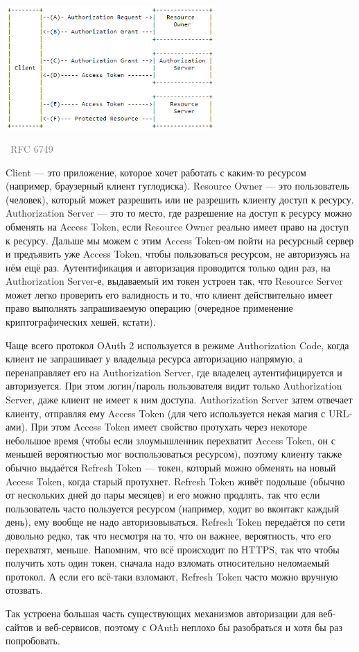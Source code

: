 \documentclass[a5paper]{article}
\newcommand{\attribution}[1] {
\vspace{-5mm}\begin{flushright}\begin{scriptsize}\textcolor{gray}{\textcopyright\, #1}\end{scriptsize}\end{flushright}
}
\begin{document}
\begin{center}
    \includegraphics[width=0.6\textwidth]{oauth.png}
    \attribution{RFC 6749}
\end{center}

Client --- это приложение, которое хочет работать с каким-то ресурсом (например, браузерный клиент гуглодиска). Resource Owner --- это пользователь (человек), который может разрешить или не разрешить клиенту доступ к ресурсу. Authorization Server --- это то место, где разрешение на доступ к ресурсу можно обменять на Access Token, если Resource Owner реально имеет право на доступ к ресурсу. Дальше мы можем с этим Access Token-ом пойти на ресурсный сервер и предъявить уже Access Token, чтобы пользоваться ресурсом, не авторизуясь на нём ещё раз. Аутентификация и авторизация проводится только один раз, на Authorization Server-е, выдаваемый им токен устроен так, что Resource Server может легко проверить его валидность и то, что клиент действительно имеет право выполнять запрашиваемую операцию (очередное применение криптографических хешей, кстати).

Чаще всего протокол OAuth 2 используется в режиме Authorization Code, когда клиент не запрашивает у владельца ресурса авторизацию напрямую, а перенаправляет его на Authorization Server, где владелец аутентифицируется и авторизуется. При этом логин/пароль пользователя видит только Authorization Server, даже клиент не имеет к ним доступа. Authorization Server затем отвечает клиенту, отправляя ему Access Token (для чего используется некая магия с URL-ами). При этом Access Token имеет свойство протухать через некоторе небольшое время (чтобы если злоумышленник перехватит Access Token, он с меньшей вероятностью мог воспользоваться ресурсом), поэтому клиенту также обычно выдаётся Refresh Token --- токен, который можно обменять на новый Access Token, когда старый протухнет. Refresh Token живёт подольше (обычно от нескольких дней до пары месяцев) и его можно продлять, так что если пользователь часто пользуется ресурсом (например, ходит во вконтакт каждый день), ему вообще не надо авторизовываться. Refresh Token передаётся по сети довольно редко, так что несмотря на то, что он важнее, вероятность, что его перехватят, меньше. Напомним, что всё происходит по HTTPS, так что чтобы получить хоть один токен, сначала надо взломать относительно неломаемый протокол. А если его всё-таки взломают, Refresh Token часто можно вручную отозвать.

Так устроена большая часть существующих механизмов авторизации для веб-сайтов и веб-сервисов, поэтому с OAuth неплохо бы разобраться и хотя бы раз попробовать.
\end{document}

